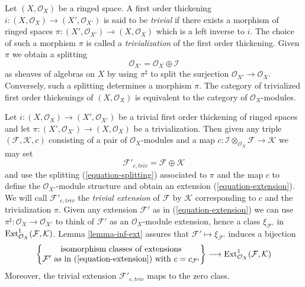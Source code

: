 \begin{remark}
\label{remark-trivial-thickening}
Let $(X, \mathcal{O}_X)$ be a ringed space. A first order thickening
$i : (X, \mathcal{O}_X) \to (X', \mathcal{O}_{X'})$ is said
to be {\it trivial} if there exists a morphism of ringed spaces
$\pi : (X', \mathcal{O}_{X'}) \to (X, \mathcal{O}_X)$ which is a
left inverse to $i$. The choice of such a morphism
$\pi$ is called a {\it trivialization} of the first order thickening.
Given $\pi$ we obtain a splitting
\begin{equation}
\label{equation-splitting}
\mathcal{O}_{X'} = \mathcal{O}_X \oplus \mathcal{I}
\end{equation}
as sheaves of algebras on $X$ by using $\pi^\sharp$ to split the surjection
$\mathcal{O}_{X'} \to \mathcal{O}_X$. Conversely, such a splitting determines
a morphism $\pi$. The category of trivialized first order thickenings of
$(X, \mathcal{O}_X)$ is equivalent to the category of 
$\mathcal{O}_X$-modules.
\end{remark}

\begin{remark}
\label{remark-trivial-extension}
Let $i : (X, \mathcal{O}_X) \to (X', \mathcal{O}_{X'})$
be a trivial first order thickening of ringed spaces
and let $\pi : (X', \mathcal{O}_{X'}) \to (X, \mathcal{O}_X)$
be a trivialization. Then given any triple
$(\mathcal{F}, \mathcal{K}, c)$ consisting of a pair of
$\mathcal{O}_X$-modules and a map
$c : \mathcal{I} \otimes_{\mathcal{O}_X} \mathcal{F} \to \mathcal{K}$
we may set
$$
\mathcal{F}'_{c, triv} = \mathcal{F} \oplus \mathcal{K}
$$
and use the splitting (\ref{equation-splitting}) associated to $\pi$
and the map $c$ to define the $\mathcal{O}_{X'}$-module structure
and obtain an extension (\ref{equation-extension}). We will call
$\mathcal{F}'_{c, triv}$ the {\it trivial extension} of $\mathcal{F}$
by $\mathcal{K}$ corresponding
to $c$ and the trivialization $\pi$. Given any extension
$\mathcal{F}'$ as in (\ref{equation-extension}) we can use
$\pi^\sharp : \mathcal{O}_X \to \mathcal{O}_{X'}$ to think of $\mathcal{F}'$
as an $\mathcal{O}_X$-module extension, hence a class $\xi_{\mathcal{F}'}$
in $\mathop{\mathrm{Ext}}\nolimits^1_{\mathcal{O}_X}(\mathcal{F}, \mathcal{K})$.
Lemma \ref{lemma-inf-ext} assures that
$\mathcal{F}' \mapsto \xi_{\mathcal{F}'}$
induces a bijection
$$
\left\{
\begin{matrix}
\text{isomorphism classes of extensions}\\
\mathcal{F}'\text{ as in (\ref{equation-extension}) with }c = c_{\mathcal{F}'}
\end{matrix}
\right\}
\longrightarrow
\mathop{\mathrm{Ext}}\nolimits^1_{\mathcal{O}_X}(\mathcal{F}, \mathcal{K})
$$
Moreover, the trivial extension $\mathcal{F}'_{c, triv}$ maps to the zero class.
\end{remark}

